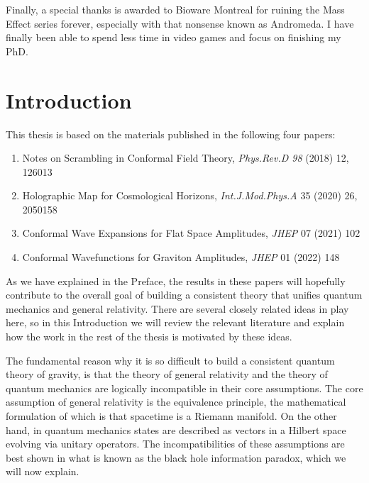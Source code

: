 \documentclass{brownthesis}
\begin{document}
Finally, a special thanks is awarded to Bioware Montreal for ruining the Mass Effect series forever, especially with that nonsense known as Andromeda. I have finally been able to spend less time in video games and focus on finishing my PhD.
\afterpreface

\chapter{Introduction}
This thesis is based on the materials published in the following four papers:
\begin{enumerate}
  \item{Notes on Scrambling in Conformal Field Theory, {\sl Phys.Rev.D 98} (2018) 12, 126013}
  \item{Holographic Map for Cosmological Horizons, {\sl Int.J.Mod.Phys.A} 35 (2020) 26, 2050158}
  \item{Conformal Wave Expansions for Flat Space Amplitudes, {\sl JHEP} 07 (2021) 102}
  \item{Conformal Wavefunctions for Graviton Amplitudes, {\sl JHEP} 01 (2022) 148}
\end{enumerate}
As we have explained in the Preface, the results in these papers will hopefully contribute to
the overall goal of building a consistent theory that unifies quantum mechanics and general
relativity. There are several closely related ideas in play here, so in this Introduction
we will review the relevant literature and explain how the work in the rest of the thesis
is motivated by these ideas.

The fundamental reason why it is so difficult to build a consistent quantum theory of
gravity, is that the theory of general relativity and the theory of quantum mechanics
are logically incompatible in their core assumptions. The core assumption of general relativity
is the equivalence principle, the mathematical formulation of which is that spacetime
is a Riemann manifold. On the other hand, in quantum mechanics states are described
as vectors in a Hilbert space evolving via unitary operators. The incompatibilities of these
assumptions are best shown in what is known as the black hole information paradox, which we will
now explain.
\end{document}
